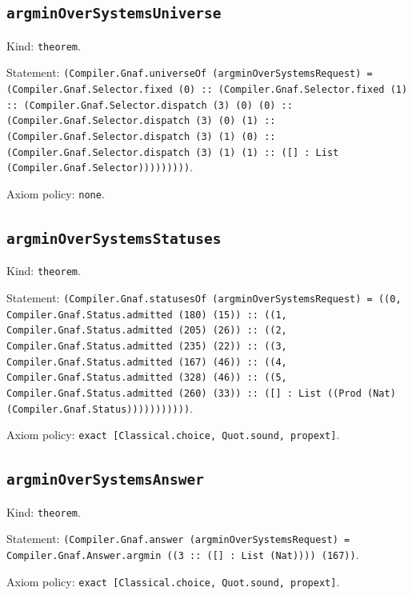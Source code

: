 \documentclass[11pt]{article}
\begin{document}
\subsection*{\texttt{argminOverSystemsUniverse}}
\noindent Kind: \texttt{theorem}.\par
\noindent Statement: \texttt{(Compiler.Gnaf.universeOf (argminOverSystemsRequest) = (Compiler.Gnaf.Selector.fixed (0) :: (Compiler.Gnaf.Selector.fixed (1) :: (Compiler.Gnaf.Selector.dispatch (3) (0) (0) :: (Compiler.Gnaf.Selector.dispatch (3) (0) (1) :: (Compiler.Gnaf.Selector.dispatch (3) (1) (0) :: (Compiler.Gnaf.Selector.dispatch (3) (1) (1) :: ([] : List (Compiler.Gnaf.Selector)))))))))}.\par
\noindent Axiom policy: \texttt{none}.\par
\subsection*{\texttt{argminOverSystemsStatuses}}
\noindent Kind: \texttt{theorem}.\par
\noindent Statement: \texttt{(Compiler.Gnaf.statusesOf (argminOverSystemsRequest) = ((0, Compiler.Gnaf.Status.admitted (180) (15)) :: ((1, Compiler.Gnaf.Status.admitted (205) (26)) :: ((2, Compiler.Gnaf.Status.admitted (235) (22)) :: ((3, Compiler.Gnaf.Status.admitted (167) (46)) :: ((4, Compiler.Gnaf.Status.admitted (328) (46)) :: ((5, Compiler.Gnaf.Status.admitted (260) (33)) :: ([] : List ((Prod (Nat) (Compiler.Gnaf.Status)))))))))))}.\par
\noindent Axiom policy: \texttt{exact [Classical.choice, Quot.sound, propext]}.\par
\subsection*{\texttt{argminOverSystemsAnswer}}
\noindent Kind: \texttt{theorem}.\par
\noindent Statement: \texttt{(Compiler.Gnaf.answer (argminOverSystemsRequest) = Compiler.Gnaf.Answer.argmin ((3 :: ([] : List (Nat)))) (167))}.\par
\noindent Axiom policy: \texttt{exact [Classical.choice, Quot.sound, propext]}.\par
\end{document}
